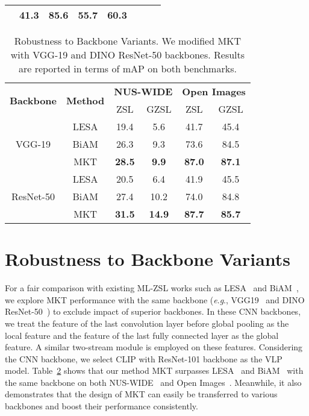 \documentclass[letterpaper]{article} \usepackage{aaai23}  \usepackage{times}  \usepackage{helvet}  \usepackage{courier}  \usepackage[hyphens]{url}  \usepackage{graphicx} \urlstyle{rm} \def\UrlFont{\rm}  \usepackage{natbib}  \usepackage{caption} \frenchspacing  \setlength{\pdfpagewidth}{8.5in}  \setlength{\pdfpageheight}{11in}
\newcommand{\eg}{\textit{e}.\textit{g}.}
\begin{document}
\begin{table}[t]
{\begin{tabular}{cccccccc}
& \textbf{41.3}  & \textbf{85.6}  & \textbf{55.7}  & \textbf{60.3}  \\
\bottomrule[0.1em]
\end{tabular}
}
\label{tab:standard}
\end{table} \begin{table}[t]
\centering
\footnotesize
\caption{Robustness to Backbone Variants. We modified MKT with VGG-19 and DINO ResNet-50 backbones. Results are reported in terms of mAP on both benchmarks. 
}
\begin{tabular}{cccc|cc} 
\toprule[0.15em]
\multirow{2}{*}{\textbf{Backbone}} & \multirow{2}{*}{\textbf{Method}} &
\multicolumn{2}{c}{\textbf{NUS-WIDE}} &  \multicolumn{2}{c}{\textbf{Open Images}} \\
& & ZSL & GZSL & ZSL & GZSL \\
\toprule[0.15em]
\multirow{3}{*}{VGG-19} 
& LESA & 19.4 & 5.6 & 41.7 & 45.4\\
& BiAM & 26.3 & 9.3 & 73.6 & 84.5\\
& MKT & \textbf{28.5} & \textbf{9.9}  
& \textbf{87.0} 
& \textbf{87.1}\\
\hline
\multirow{3}{*}{ResNet-50} 
& LESA & 20.5 & 6.4 & 41.9 & 45.5 \\
& BiAM & 27.4 & 10.2 & 74.0 & 84.8\\
& MKT & \textbf{31.5} & \textbf{14.9}
& \textbf{87.7}
& \textbf{85.7}\\
\bottomrule[0.1em]
\end{tabular}
\label{tab:switch_backbone}
\end{table}
 \section{Robustness to Backbone Variants}
\label{robustness}
For a fair comparison with existing ML-ZSL works such as LESA~\cite{lesa} and BiAM~\cite{biam}, we explore MKT performance with the same backbone (\eg, VGG19~\cite{vgg} and DINO ResNet-50~\cite{dino}) to exclude impact of superior backbones. 
In these CNN backbones, we treat the feature of the last convolution layer before global pooling as the local feature and the feature of the last fully connected layer as the global feature.
A similar two-stream module is employed on these features.
Considering the CNN backbone, we select CLIP with ResNet-101 backbone as the VLP model.
Table~\ref{tab:switch_backbone} shows that our method MKT surpasses LESA~\cite{lesa} and BiAM~\cite{biam} with the same backbone on both NUS-WIDE~\cite{nuswide} and Open Images~\cite{openiamge}.
Meanwhile, it also demonstrates that the design of MKT can easily be transferred to various backbones and boost their performance consistently.
\end{document}
